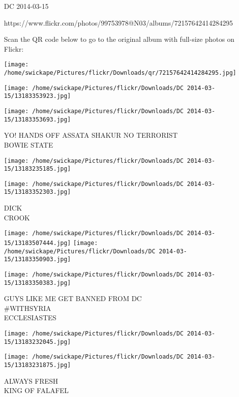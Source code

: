 \documentclass[10pt,letterpaper]{article}
\begin{document}
DC 2014-03-15

https://www.flickr.com/photos/99753978@N03/albums/72157642414284295

Scan the QR code below to go to the original album with full-size photos on Flickr:

\texttt{[image: /home/swickape/Pictures/flickr/Downloads/qr/72157642414284295.jpg]}
\pagebreak

\texttt{[image: /home/swickape/Pictures/flickr/Downloads/DC 2014-03-15/13183353923.jpg]}

\vspace{0.25in}
\texttt{[image: /home/swickape/Pictures/flickr/Downloads/DC 2014-03-15/13183353693.jpg]}

YO!  HANDS OFF ASSATA SHAKUR NO TERRORIST\\
BOWIE STATE\\
\pagebreak

\texttt{[image: /home/swickape/Pictures/flickr/Downloads/DC 2014-03-15/13183235185.jpg]}

\vspace{0.25in}
\texttt{[image: /home/swickape/Pictures/flickr/Downloads/DC 2014-03-15/13183352303.jpg]}

DICK\\
CROOK\\
\pagebreak

\texttt{[image: /home/swickape/Pictures/flickr/Downloads/DC 2014-03-15/13183507444.jpg]}
\texttt{[image: /home/swickape/Pictures/flickr/Downloads/DC 2014-03-15/13183350903.jpg]}

\texttt{[image: /home/swickape/Pictures/flickr/Downloads/DC 2014-03-15/13183350383.jpg]}

GUYS LIKE ME GET BANNED FROM DC\\
\#WITHSYRIA\\
ECCLESIASTES\\
\pagebreak

\texttt{[image: /home/swickape/Pictures/flickr/Downloads/DC 2014-03-15/13183232045.jpg]}

\vspace{0.25in}
\texttt{[image: /home/swickape/Pictures/flickr/Downloads/DC 2014-03-15/13183231875.jpg]}

ALWAYS FRESH\\
KING OF FALAFEL\\
\pagebreak
\end{document}
